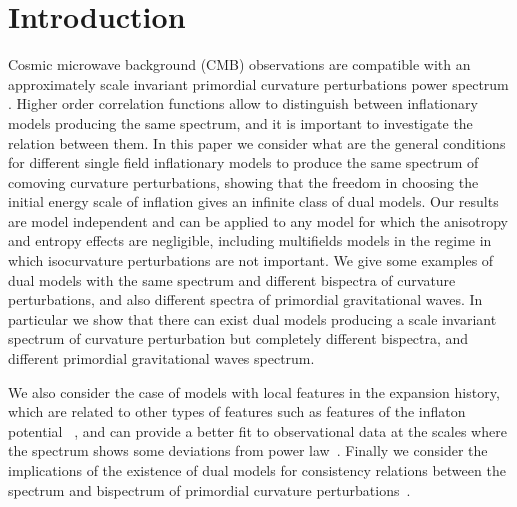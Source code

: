 \documentclass[aps,prl,amsmath,nofootinbib,twocolumn]{revtex4}
\newcommand{\3}{\partial}
\newcommand{\4}{\frac}
\newcommand{\5}{\delta}
\renewcommand\({\left(}
\renewcommand\){\right)}
\renewcommand\[{\left[}
\renewcommand\]{\right]}
\begin{document}
\section{Introduction}
Cosmic microwave background (CMB) observations are compatible with an approximately scale invariant primordial curvature perturbations power spectrum \cite{wmapfmr,Adam:2015rua,Ade:2015xua,Ade:2015lrj, Chung:2005hn}. Higher order correlation functions allow to distinguish between inflationary models producing the same spectrum, and it is important to investigate the relation between them. In this paper we consider what are the general conditions for different single field inflationary models to produce the same spectrum of comoving curvature perturbations, showing that the freedom in choosing the initial energy scale of inflation gives an infinite class of dual models. Our results are model independent  and can be applied  to any model for which the anisotropy and  entropy effects are negligible, including multifields models in the regime in which isocurvature perturbations are not important. We give some examples of dual models with the same spectrum and different bispectra of curvature perturbations, and also different spectra of primordial gravitational waves.
In particular we show that there can exist dual models producing a scale invariant spectrum of curvature perturbation but completely different bispectra, and different primordial gravitational waves spectrum.

We also consider the case of models with local features in the expansion history, which are related to other types of features such as features of the inflaton potential ~\cite{Starobinsky:1992ts, Adams2, Adams:2001vc,  Gariazzo:2014dla, Gariazzo:2015qea, Hazra:2014jwa,  Hazra:2016fkm, Cadavid:2015iya, GallegoCadavid:2016wcz, GallegoCadavid:2015bsn, GallegoCadavid:2017pol, Palma:2014hra, pp, Arroja:2011yu, Chen:2011zf, Hazra:2014goa, Martin:2014kja, Romano:2014kla, Starobinsky:1998mj}, and  can provide a better fit to  observational data at the scales  where the spectrum shows some deviations from  power law~\cite{constraints2,Adams2, Adams:2001vc,Gariazzo:2015qea, Gariazzo:2014dla,Hazra:2014jwa, Hunt:2013bha, Joy:2007na, Joy:2008qd, Hazra:2016fkm}.
Finally we consider the implications of the existence of dual models for consistency relations between the spectrum and bispectrum of primordial curvature perturbations~\cite{Palma:2014hra, Romano:2016gop, Chung:2005hn, Mooij:2015cxa, Creminelli:2012ed}. 
\end{document}
